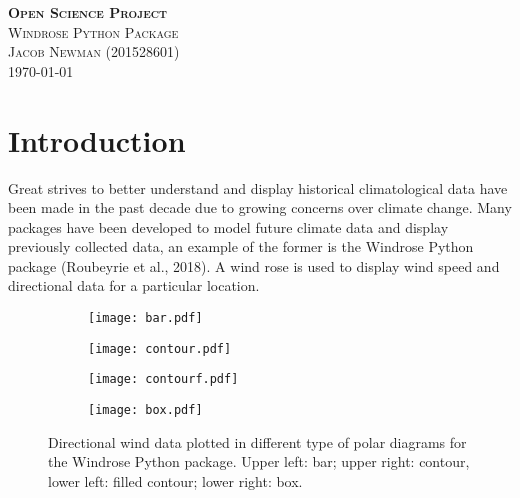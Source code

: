 \documentclass{article}
\begin{document}
\begin{titlepage}
\newcommand{\HRule}{\rule{\linewidth}{0.5mm}}

\center
\textsc{\LARGE \textbf{Open Science Project}}\\[1 cm]

\textsc{\Large Windrose Python Package}\\[0.5 cm]

\textsc{\large Jacob Newman (201528601)}\\[0.5 cm]





\vfill\vfill\vfill
{\large\today}
\vfill

\end{titlepage}


\section{Introduction}\label{Introduction}
Great strives to better understand and display historical climatological data have been made in the past decade due to growing concerns over climate change. Many packages have been developed to model 
future climate data and display previously collected data, an example of the former is the Windrose Python package (Roubeyrie et al., 2018). A wind rose is used to display wind speed and directional data 
for a particular location.  

\begin{figure}[h!]
\begin{subfigure}{.55\textwidth}
\centering
\texttt{[image: bar.pdf]}
\label{bar_windrose}
\end{subfigure}
\begin{subfigure}{.55\textwidth}
\centering
\texttt{[image: contour.pdf]}
\label{contour}
\end{subfigure}
\begin{subfigure}{.55\textwidth}
\centering
\texttt{[image: contourf.pdf]}
\label{contourf_windrose}
\end{subfigure}
\begin{subfigure}{.55\textwidth}
\centering
\texttt{[image: box.pdf]}
\label{box_windrose}
\end{subfigure}
\label{windrose_diagrams}
\caption{Directional wind data plotted in different type of polar diagrams for the Windrose Python package. 
Upper left: bar; upper right: contour, lower left: filled contour; lower right: box.}
\end{figure}
\end{document}
